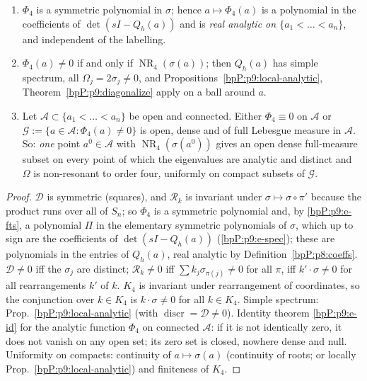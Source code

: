 \begin{proposition}\label{bpP:p9:good-set}
\begin{enumerate}[label=(\alph*)]
\item $\Phi_4$ is a symmetric polynomial in $\sigma$; hence $a\mapsto\Phi_4(a)$ is a polynomial in the coefficients of $\det(sI-Q_h(a))$ and is \emph{real analytic on $\{a_1<\dots<a_n\}$}, and independent of the labelling.
\item $\Phi_4(a)\ne0$ if and only if $\operatorname{NR}_4(\sigma(a))$; then $Q_h(a)$ has simple spectrum, all $\Omega_j=2\sigma_j\ne0$, and Propositions~\ref{bpP:p9:local-analytic}, Theorem~\ref{bpP:p9:diagonalize} apply on a ball around $a$.
\item Let $\mathcal A\subset\{a_1<\dots<a_n\}$ be open and connected. Either $\Phi_4\equiv0$ on $\mathcal A$ or $\mathcal G:=\{a\in\mathcal A:\Phi_4(a)\ne0\}$ is open, dense and of full Lebesgue measure in $\mathcal A$. So: \emph{one} point $a^0\in\mathcal A$ with $\operatorname{NR}_4(\sigma(a^0))$ gives an open dense full-measure subset on every point of which the eigenvalues are analytic and distinct and $\Omega$ is non-resonant to order four, uniformly on compact subsets of $\mathcal G$.
\end{enumerate}
\end{proposition}
\begin{proof}
\label{stepP:p9:gs-a} $\mathcal D$ is symmetric (squares), and $\mathcal R_k$ is invariant under $\sigma\mapsto\sigma\circ\pi'$ because the product runs over all of $S_n$; so $\Phi_4$ is a symmetric polynomial and, by \ref{bpP:p9:e-fts}, a polynomial $\Pi$ in the elementary symmetric polynomials of $\sigma$, which up to sign are the coefficients of $\det(sI-Q_h(a))$ (\ref{bpP:p9:e-spec}); these are polynomials in the entries of $Q_h(a)$, real analytic by Definition~\ref{bpP:p8:coeffs}.
\label{stepP:p9:gs-b} $\mathcal D\ne0$ iff the $\sigma_j$ are distinct; $\mathcal R_k\ne0$ iff $\sum k_j\sigma_{\pi(j)}\ne0$ for all $\pi$, iff $k'\cdot\sigma\ne0$ for all rearrangements $k'$ of $k$. $K_4$ is invariant under rearrangement of coordinates, so the conjunction over $k\in K_4$ is $k\cdot\sigma\ne0$ for all $k\in K_4$. Simple spectrum: Prop.~\ref{bpP:p9:local-analytic} (with $\operatorname{discr}=\mathcal D\ne0$).
\label{stepP:p9:gs-c} Identity theorem \ref{bpP:p9:e-id} for the analytic function $\Phi_4$ on connected $\mathcal A$: if it is not identically zero, it does not vanish on any open set; its zero set is closed, nowhere dense and null. Uniformity on compacts: continuity of $a\mapsto\sigma(a)$ (continuity of roots; or locally Prop.~\ref{bpP:p9:local-analytic}) and finiteness of $K_4$.
\end{proof}

